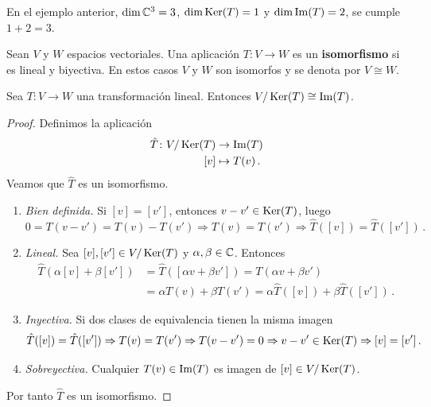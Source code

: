 \begin{eje}
  En el ejemplo anterior, $\dim\mathbb{C}^3 = 3$, $\dim\operatorname{Ker}(T)=1$ y $\dim\operatorname{Im}(T)=2$, se cumple $1+2=3$.
\end{eje}

\begin{defi}
  Sean $V$ y $W$ espacios vectoriales. Una aplicación $T\colon V\to W$ es un \textbf{isomorfismo} si es lineal y biyectiva. En estos casos $V$ y $W$ son isomorfos y se denota por $V\cong W$.
\end{defi}


\begin{theo}
  \label{th:descomposicion}
  Sea $T\colon V\to W$ una transformación lineal. Entonces $V/\operatorname{Ker}(T)\cong\operatorname{Im}(T)$.
\end{theo}
\begin{proof}
  Definimos la aplicación
  \begin{align*}
    \hat{T}\colon V/\operatorname{Ker}(T) & \to\operatorname{Im}(T)      \\
    [v]                     & \mapsto T(v)\,.
  \end{align*}
  Veamos que $\hat{T}$ es un isomorfismo.
  \begin{enumerate}
    \item
          \textit{Bien definida.} Si $[v]=[v']$, entonces $v-v'\in\operatorname{Ker}(T)$, luego
          \[
            0=T(v-v')=T(v)-T(v')\Rightarrow T(v)=T(v')\Rightarrow \hat{T}([v])=\hat{T}([v'])\,.
          \]
    \item
          \textit{Lineal.} Sea $[v],[v']\in V/\operatorname{Ker}(T)$ y $\alpha,\beta\in\mathbb{C}$. Entonces
          \begin{align*}
            \hat{T}(\alpha [v]+\beta[v']) & = \hat{T}([\alpha v+\beta v']) = T(\alpha v+\beta v')                \\
                                          & = \alpha T(v)+\beta T(v') = \alpha\hat{T}([v])+\beta\hat{T}([v'])\,.
          \end{align*}
    \item
          \textit{Inyectiva.} Si dos clases de equivalencia tienen la misma imagen
          \[
            \hat{T}([v])=\hat{T}([v'])\Rightarrow T(v)=T(v')\Rightarrow T(v-v')=0\Rightarrow v-v'\in\operatorname{Ker}(T)\Rightarrow[v]=[v']\,.
          \]

    \item
          \textit{Sobreyectiva.} Cualquier $T(v)\in\operatorname{Im}(T)$ es imagen de $[v]\in V/\operatorname{Ker}(T)$.
  \end{enumerate}

  Por tanto $\hat{T}$ es un isomorfismo.
\end{proof}

